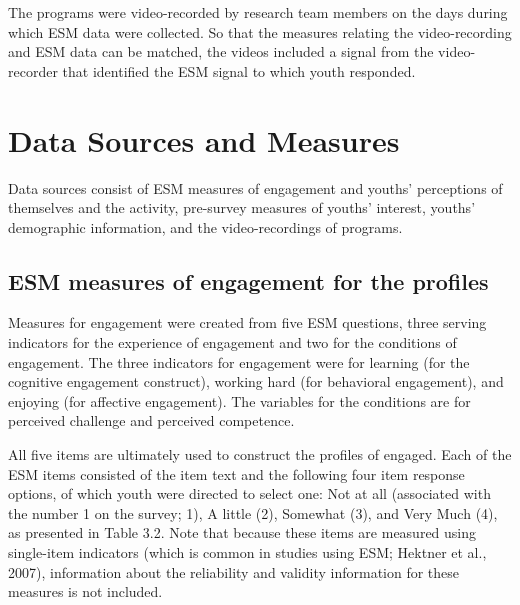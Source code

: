 \documentclass[]{msu-thesis}
\theoremstyle{definition}
\theoremstyle{definition}
\theoremstyle{definition}
\theoremstyle{remark}
\begin{document}
The programs were video-recorded by research team members on the days
during which ESM data were collected. So that the measures relating the
video-recording and ESM data can be matched, the videos included a
signal from the video-recorder that identified the ESM signal to which
youth responded.

\section{Data Sources and Measures}\label{data-sources-and-measures}

Data sources consist of ESM measures of engagement and youths'
perceptions of themselves and the activity, pre-survey measures of
youths' interest, youths' demographic information, and the
video-recordings of programs.

\subsection{ESM measures of engagement for the
profiles}\label{esm-measures-of-engagement-for-the-profiles}

Measures for engagement were created from five ESM questions, three
serving indicators for the experience of engagement and two for the
conditions of engagement. The three indicators for engagement were for
learning (for the cognitive engagement construct), working hard (for
behavioral engagement), and enjoying (for affective engagement). The
variables for the conditions are for perceived challenge and perceived
competence.

All five items are ultimately used to construct the profiles of engaged.
Each of the ESM items consisted of the item text and the following four
item response options, of which youth were directed to select one: Not
at all (associated with the number 1 on the survey; 1), A little (2),
Somewhat (3), and Very Much (4), as presented in Table 3.2. Note that
because these items are measured using single-item indicators (which is
common in studies using ESM; Hektner et al., 2007), information about
the reliability and validity information for these measures is not
included.

\begin{table}

\caption{\label{tab:unnamed-chunk-4}ESM measures for profiles}
\centering
{}
\end{table}
\end{document}
